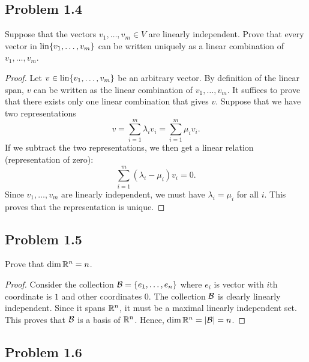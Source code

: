 \documentclass[12pt]{article}
\begin{document}
\subsection{Problem 1.4}

\begin{problem}
	Suppose that the vectors $v_1, \ldots, v_m \in V$ are linearly independent. Prove that every vector in $\operatorname{lin} \{v_1, \ldots, v_m\}$ can be written uniquely as a linear combination of $v_1, \ldots, v_m$. 
\end{problem}

\begin{proof}
	Let $v \in \operatorname{lin} \{v_1, \ldots, v_m\}$ be an arbitrary vector. By definition of the linear span, $v$ can be written as the linear combination of $v_1, \ldots, v_m$. It suffices to prove that there exists only one linear combination that gives $v$. Suppose that we have two representations
	\[
		v = \sum_{i = 1}^m \lambda_i v_i = \sum_{i = 1}^m \mu_i v_i.
	\]
	If we subtract the two representations, we then get a linear relation (representation of zero):
	\[
		\sum_{i = 1}^m (\lambda_i - \mu_i) v_i = 0.
	\]
	Since $v_1, \ldots, v_m$ are linearly independent, we must have $\lambda_i = \mu_i$ for all $i$. This proves that the representation is unique. 
\end{proof}

\newpage 

\subsection{Problem 1.5}

\begin{problem}
	Prove that $\dim \mathbb{R}^n = n$. 
\end{problem}
\begin{proof}
	Consider the collection $\mathcal{B} = \{e_1, \ldots, e_n\}$ where $e_i$ is vector with $i$th coordinate is $1$ and other coordinates $0$. The collection $\mathcal{B}$ is clearly linearly independent. Since it spans $\mathbb{R}^n$, it must be a maximal linearly independent set. This proves that $\mathcal{B}$ is a basis of $\mathbb{R}^n$. Hence, $\dim \mathbb{R}^n = |\mathcal{B}| = n$. 
\end{proof}

\newpage 

\subsection{Problem 1.6}
\end{document}
